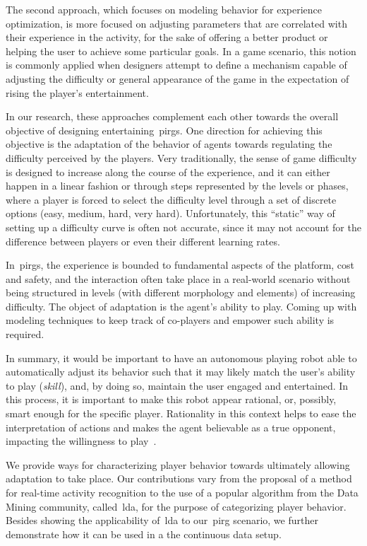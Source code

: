 The second approach, which focuses on modeling behavior for experience optimization, is more focused on adjusting parameters that are correlated with their experience in the activity, for the sake of offering a better product or helping the user to achieve some particular goals. In a game scenario, this notion is commonly applied when designers attempt to define a mechanism capable of adjusting the difficulty or general appearance of the game in the expectation of rising the player's entertainment.

In our research, these approaches complement each other towards the overall objective of designing entertaining~\glspl{pirg}. One direction for achieving this objective is the adaptation of the behavior of agents towards regulating the difficulty perceived by the players. Very traditionally, the sense of game difficulty is designed to increase along the course of the experience, and it can either happen in a linear fashion or through steps represented by the levels or phases, where a player is forced to select the difficulty level through a set of discrete options (easy, medium, hard, very hard). Unfortunately, this ``static'' way of setting up a difficulty curve is often not accurate, since it may not account for the difference between players or even their different learning rates. 

In~\glspl{pirg}, the experience is bounded to fundamental aspects of the platform, \eg cost and safety, and the interaction often take place in a real-world scenario without being structured in levels (with different morphology and elements) of increasing difficulty. The object of adaptation is the agent's ability to play. Coming up with modeling techniques to keep track of co-players and empower such ability is required.

In summary, it would be important to have an autonomous playing robot able to automatically adjust its behavior such that it may likely match the user's ability to play (\textit{skill}), and, by doing so, maintain the user engaged and entertained. In this process, it is important to make this robot appear rational, or, possibly, smart enough for the specific player. Rationality in this context helps to ease the interpretation of actions and makes the agent believable as a true opponent, impacting the willingness to play~\citep{martinoia_physically_2013, bonarini_timing_2014}. 

We provide ways for characterizing player behavior towards ultimately allowing adaptation to take place. Our contributions vary from the proposal of a method for real-time activity recognition to the use of a popular algorithm from the Data Mining community, called~\acrfull{lda}, for the purpose of categorizing player behavior. Besides showing the applicability of~\gls{lda} to our~\gls{pirg} scenario, we further demonstrate how it can be used in a the continuous data setup.


